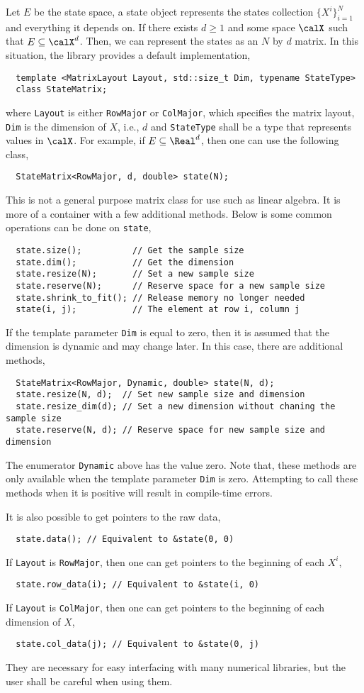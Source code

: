 Let $E$ be the state space, a state object represents the states collection
$\{X^i\}_{i=1}^N$ and everything it depends on. If there exists $d\ge1$ and
some space $\calX$ such that $E\subseteq\calX^d$. Then, we can represent the
states as an $N$ by $d$ matrix. In this situation, the library provides a
default implementation,
\begin{Verbatim}
  template <MatrixLayout Layout, std::size_t Dim, typename StateType>
  class StateMatrix;
\end{Verbatim}
where \verb|Layout| is either \verb|RowMajor| or \verb|ColMajor|, which
specifies the matrix layout, \verb|Dim| is the dimension of $X$, i.e., $d$ and
\verb|StateType| shall be a \cpp type that represents values in $\calX$. For
example, if $E\subseteq\Real^d$, then one can use the following class,
\begin{Verbatim}
  StateMatrix<RowMajor, d, double> state(N);
\end{Verbatim}
This is not a general purpose matrix class for use such as linear algebra. It
is more of a container with a few additional methods. Below is some common
operations can be done on \verb|state|,
\begin{Verbatim}
  state.size();          // Get the sample size
  state.dim();           // Get the dimension
  state.resize(N);       // Set a new sample size
  state.reserve(N);      // Reserve space for a new sample size
  state.shrink_to_fit(); // Release memory no longer needed
  state(i, j);           // The element at row i, column j
\end{Verbatim}
If the template parameter \verb|Dim| is equal to zero, then it is assumed that
the dimension is dynamic and may change later. In this case, there are
additional methods,
\begin{Verbatim}
  StateMatrix<RowMajor, Dynamic, double> state(N, d);
  state.resize(N, d);  // Set new sample size and dimension
  state.resize_dim(d); // Set a new dimension without chaning the sample size
  state.reserve(N, d); // Reserve space for new sample size and dimension
\end{Verbatim}
The enumerator \verb|Dynamic| above has the value zero. Note that, these
methods are only available when the template parameter \verb|Dim| is zero.
Attempting to call these methods when it is positive will result in
compile-time errors.

It is also possible to get pointers to the raw data,
\begin{Verbatim}
  state.data(); // Equivalent to &state(0, 0)
\end{Verbatim}
If \verb|Layout| is \verb|RowMajor|, then one can get pointers to the beginning
of each $X^i$,
\begin{Verbatim}
  state.row_data(i); // Equivalent to &state(i, 0)
\end{Verbatim}
If \verb|Layout| is \verb|ColMajor|, then one can get pointers to the beginning
of each dimension of $X$,
\begin{Verbatim}
  state.col_data(j); // Equivalent to &state(0, j)
\end{Verbatim}
They are necessary for easy interfacing with many numerical libraries, but the
user shall be careful when using them.

